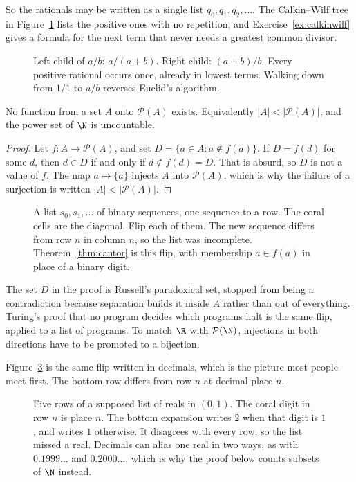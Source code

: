 So the rationals may be written as a single list $q_0,q_1,q_2,\ldots$. The Calkin--Wilf tree in Figure~\ref{fig:calkinwilf} lists the positive ones with no repetition, and Exercise~\ref{ex:calkinwilf} gives a formula for the next term that never needs a greatest common divisor.

\begin{figure}[ht]
\centering
{}
\caption{Left child of $a/b$: $a/(a+b)$. Right child: $(a+b)/b$. Every positive rational occurs once, already in lowest terms. Walking down from $1/1$ to $a/b$ reverses Euclid's algorithm.}
\label{fig:calkinwilf}
\end{figure}

\begin{theorem}[Cantor, 1891]\label{thm:cantor}
No function from a set $A$ onto $\mathcal P(A)$ exists. Equivalently $|A|<|\mathcal P(A)|$, and the power set of $\N$ is uncountable.
\end{theorem}
\begin{proof}
Let $f:A\to\mathcal P(A)$, and set $D=\{a\in A:a\notin f(a)\}$. If $D=f(d)$ for some $d$, then $d\in D$ if and only if $d\notin f(d)=D$. That is absurd, so $D$ is not a value of $f$. The map $a\mapsto\{a\}$ injects $A$ into $\mathcal P(A)$, which is why the failure of a surjection is written $|A|<|\mathcal P(A)|$.
\end{proof}

\begin{figure}[ht]
\centering
{}
\caption{A list $s_0,s_1,\ldots$ of binary sequences, one sequence to a row. The coral cells are the diagonal. Flip each of them. The new sequence differs from row $n$ in column $n$, so the list was incomplete. Theorem~\ref{thm:cantor} is this flip, with membership $a\in f(a)$ in place of a binary digit.}
\label{fig:diagonal}
\end{figure}

The set $D$ in the proof is Russell's paradoxical set, stopped from being a contradiction because separation builds it inside $A$ rather than out of everything. Turing's proof that no program decides which programs halt is the same flip, applied to a list of programs. To match $\R$ with $\mathcal P(\N)$, injections in both directions have to be promoted to a bijection.

Figure~\ref{fig:rw-reals} is the same flip written in decimals, which is the picture most people meet first. The bottom row differs from row $n$ at decimal place $n$.

\begin{figure}[ht]
\centering
{}
\caption{Five rows of a supposed list of reals in $(0,1)$. The coral digit in row $n$ is place $n$. The bottom expansion writes $2$ when that digit is $1$, and writes $1$ otherwise. It disagrees with every row, so the list missed a real. Decimals can alias one real in two ways, as with $0.1999\ldots$ and $0.2000\ldots$, which is why the proof below counts subsets of $\N$ instead.}
\label{fig:rw-reals}
\end{figure}

